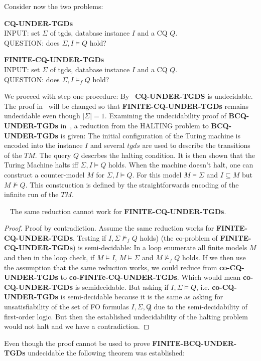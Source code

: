 Consider now the two problems:
\begin{framed}\noindent \textbf{CQ-UNDER-TGDs}\\
	INPUT: set $\Sigma$ of tgds, database instance $I$ and a CQ $Q$.\\
	QUESTION: does $\Sigma, I\models Q$ hold? 
\end{framed}
\begin{framed}\noindent \textbf{FINITE-CQ-UNDER-TGDs}\\
	INPUT: set $\Sigma$ of tgds, database instance $I$ and a CQ $Q$.\\
	QUESTION: does $\Sigma, I\models_f Q$ hold? 
\end{framed}
We proceed with step one procedure:
By~\cite{cali2008taming} \textbf{CQ-UNDER-TGDS} is undecidable. The proof
in~\cite{cali2008taming} will be changed so that
\textbf{FINITE-CQ-UNDER-TGDs} remains
undecidable even though $|\Sigma| = 1$.
Examining the undecidability proof of \textbf{BCQ-UNDER-TGDs} in~\cite{cali2008taming}, 
a reduction from the HALTING problem to \textbf{BCQ-UNDER-TGDs} is given: The
initial configuration of the Turing machine is encoded into the instance $I$ and
several $tgds$ are used to describe the transitions of the $TM$. The query $Q$
descrbes the halting condition.
It is then shown that the Turing Machine halts iff $\Sigma,I \models Q$ holds.
When the machine doesn't halt, one can construct a counter-model $M$ for
$\Sigma,I \models Q$. For this model $M \models \Sigma$ and $I \subseteq M$ but
$M \not \models Q$. This construction is defined by the straightforwards
encoding of the infinite run of the $TM$. 
\begin{proposition}~\cite{pichler2014containment}
	The same reduction cannot work for \textbf{FINITE-CQ-UNDER-TGDs}.
\end{proposition}

\begin{proof}
Proof by contradiction.	
Assume the same reduction works for \textbf{FINITE-CQ-UNDER-TGDs}.
Testing if $I,\Sigma \not\models_f Q$ holds) (the co-problem of
\textbf{FINITE-CQ-UNDER-TGDs}) is semi-decidable:
In a loop enumerate all finite models $M$ and then in the loop check, if $M
\models I$, $M \models \Sigma$ and $M \not\models_f Q$ holds. If we then use the
assumption that the same reduction works, we could reduce from
\textbf{co-CQ-UNDER-TGDs}
to \textbf{co-FINITe-CQ-UNDER-TGDs}. Which would mean \textbf{co-CQ-UNDER-TGDs} is semidecidable.
But asking if $I,\Sigma \models Q$, i.e. \textbf{co-CQ-UNDER-TGDs} is semi-decidable because it is the same as asking for unsatisfiability of the set of FO formulas $I,\Sigma,\not Q$ due to
the semi-decidability of first-order logic. But then the established
undecidability of the halting problem would not halt and we have a
contradiction.
\end{proof}
Even though the proof cannot be used to prove \textbf{FINITE-BCQ-UNDER-TGDs} undecidable
the following theorem was established:

